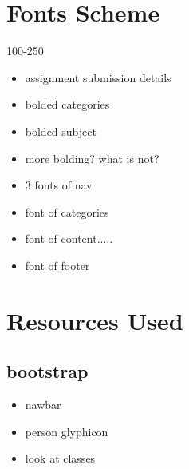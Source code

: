 \documentclass[10pt,a4paper]{article}
\begin{document}
\section{Fonts Scheme}
100-250
\begin{itemize}
	\item assignment submission details
	\item bolded categories
	\item bolded subject
	\item more bolding? what is not?
	\item 3 fonts of nav
	\item font of categories
	\item font of content.....
	\item font of footer
\end{itemize}
\section{Resources Used}
\subsection{bootstrap}
\begin{itemize}
	\item nawbar
	\item person glyphicon
	\item look at classes
\end{itemize}
\end{document}
